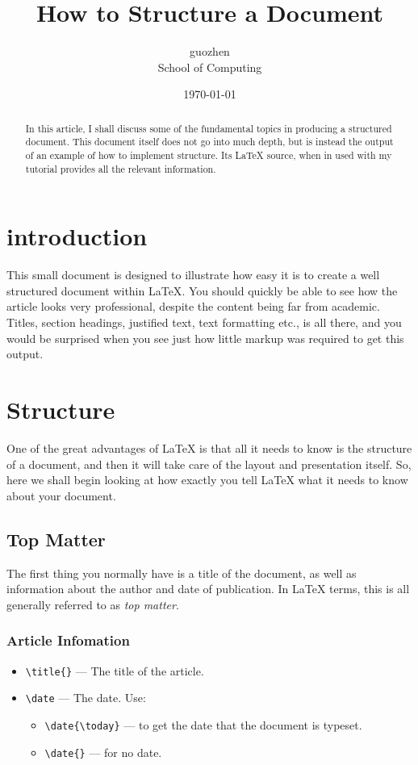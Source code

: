 \documentclass{article}
\begin{document}
\title{How to Structure a \Latex{} Document}
\author{guozhen\\
  School of Computing\\
}
\date{\today}
\maketitle{}
\begin{abstract}
  In this article, I shall discuss some of the fundamental topics in
producing a structured document.  This document itself does not go into
much depth, but is instead the output of an example of how to implement
structure. Its \LaTeX{} source, when in used with my tutorial
provides all the relevant information.
\end{abstract}

\section{introduction}
\label{sec:introduction}
This small document is designed to illustrate how easy it is to create a well structured
document within \LaTeX\cite{lamport94}.  You should quickly be able to see how the article
looks very professional, despite the content being far from academic.  Titles, section
headings, justified text, text formatting etc., is all there, and you would be surprised
when you see just how little markup was required to get this output.

\section{Structure}
\label{sec:structure}
One of the great advantages of \LaTeX{} is that all it needs to know is
the structure of a document, and then it will take care of the layout
and presentation itself.  So, here we shall begin looking at how exactly
you tell \LaTeX{} what it needs to know about your document.

\subsection{Top Matter}
\label{sec:top-matter}
The first thing you normally have is a title of the document, as well as
information about the author and date of publication.  In \LaTeX{} terms,
this is all generally referred to as \emph{top matter}.

\subsubsection{Article Infomation}
\label{sec:article-information}
\begin{itemize}
\item \verb|\title{}| --- The title of the article.
\item \verb|\date| --- The date. Use:
  \begin{itemize}
  \item \verb|\date{\today}| --- to get the date that the document is typeset.
  \item \verb|\date{}| --- for no date.
  \end{itemize}
\end{itemize}
\end{document}

